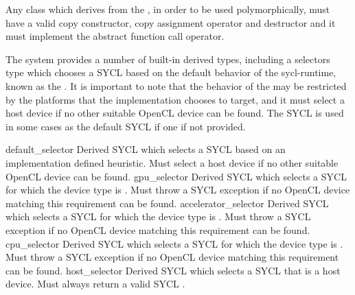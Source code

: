 Any class which derives from the , in order to
be used polymorphically, must have a valid copy constructor,
copy assignment operator and destructor and it must implement the
abstract function call operator.

The system provides a number of built-in derived  types, including a selectors type which chooses a SYCL  based on the default behavior of the \gls{sycl-runtime}, known as the . It is important to note that the behavior of the  may be restricted by the platforms that the implementation chooses to target, and it must select a host device if no other suitable OpenCL device can be found. The SYCL  is used in some cases as the default SYCL  if one if not provided.

  \addRow
    {default_selector}
    {
      Derived SYCL  which selects a SYCL  based on an implementation defined heuristic. Must select a host device if no other suitable OpenCL device can be found.
    }
  \addRow
    {gpu_selector}
    {
      Derived SYCL  which selects a SYCL  for which the device type is . Must throw a  SYCL exception if no OpenCL device matching this requirement can be found.
    }
  \addRow
    {accelerator_selector}
    {
      Derived SYCL  which selects a SYCL  for which the device type is . Must throw a  SYCL exception if no OpenCL device matching this requirement can be found.
    }
  \addRow
    {cpu_selector}
    {
      Derived SYCL  which selects a SYCL  for which the device type is . Must throw a  SYCL exception if no OpenCL device matching this requirement can be found.    
    }
  \addRow
    {host_selector}
    {
      Derived SYCL  which selects a SYCL  that is a host device. Must always return a valid SYCL .
    }

